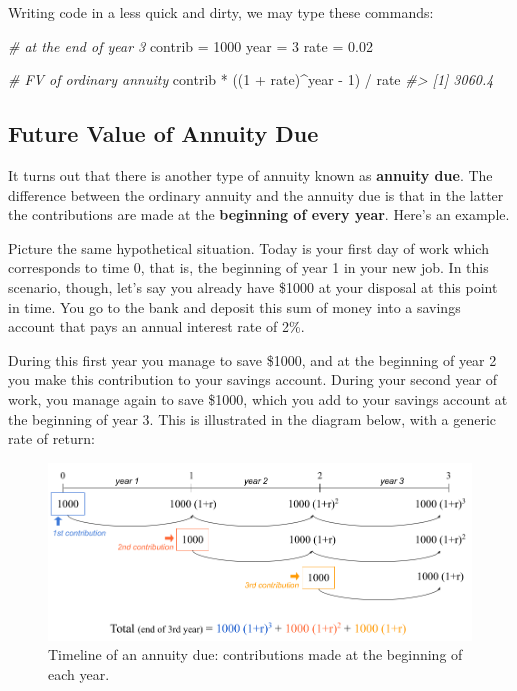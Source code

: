 \documentclass[
]{book}
\newenvironment{Shaded}{\begin{snugshade}}{\end{snugshade}}
\newcommand{\CommentTok}[1]{\textcolor[rgb]{0.56,0.35,0.01}{\textit{#1}}}
\newcommand{\DecValTok}[1]{\textcolor[rgb]{0.00,0.00,0.81}{#1}}
\newcommand{\FloatTok}[1]{\textcolor[rgb]{0.00,0.00,0.81}{#1}}
\newcommand{\NormalTok}[1]{#1}
\newcommand{\OtherTok}[1]{\textcolor[rgb]{0.56,0.35,0.01}{#1}}
\newcommand{\SpecialCharTok}[1]{\textcolor[rgb]{0.00,0.00,0.00}{#1}}
\begin{document}
Writing code in a less quick and dirty, we may type these commands:

\begin{Shaded}
\begin{Highlighting}[]
\CommentTok{\# at the end of year 3}
\NormalTok{contrib }\OtherTok{=} \DecValTok{1000}
\NormalTok{year }\OtherTok{=} \DecValTok{3}
\NormalTok{rate }\OtherTok{=} \FloatTok{0.02}

\CommentTok{\# FV of ordinary annuity}
\NormalTok{contrib }\SpecialCharTok{*}\NormalTok{ ((}\DecValTok{1} \SpecialCharTok{+}\NormalTok{ rate)}\SpecialCharTok{\^{}}\NormalTok{year }\SpecialCharTok{{-}} \DecValTok{1}\NormalTok{) }\SpecialCharTok{/}\NormalTok{ rate}
\CommentTok{\#\textgreater{} [1] 3060.4}
\end{Highlighting}
\end{Shaded}

\hypertarget{future-value-of-annuity-due}{%
\subsection{Future Value of Annuity Due}\label{future-value-of-annuity-due}}

It turns out that there is another type of annuity known as \textbf{annuity due}.
The difference between the ordinary annuity and the annuity due is that in the
latter the contributions are made at the \textbf{beginning of every year}. Here's an
example.

Picture the same hypothetical situation. Today is your first day of work
which corresponds to time 0, that is, the beginning of year 1 in your new job.
In this scenario, though, let's say you already have \$1000 at your disposal
at this point in time. You go to the bank and deposit this sum of money into a
savings account that pays an annual interest rate of 2\%.

During this first year you manage to save \$1000, and at the beginning of year 2
you make this contribution to your savings account. During your second year of
work, you manage again to save \$1000, which you add to your savings account at
the beginning of year 3. This is illustrated in the diagram below, with a
generic rate of return:

\begin{figure}

{\centering \includegraphics[width=0.95\linewidth]{images/conditionals/timeline-due-annuity} 

}

\caption{Timeline of an annuity due: contributions made at the beginning of each year.}\label{fig:unnamed-chunk-213}
\end{figure}
\end{document}
